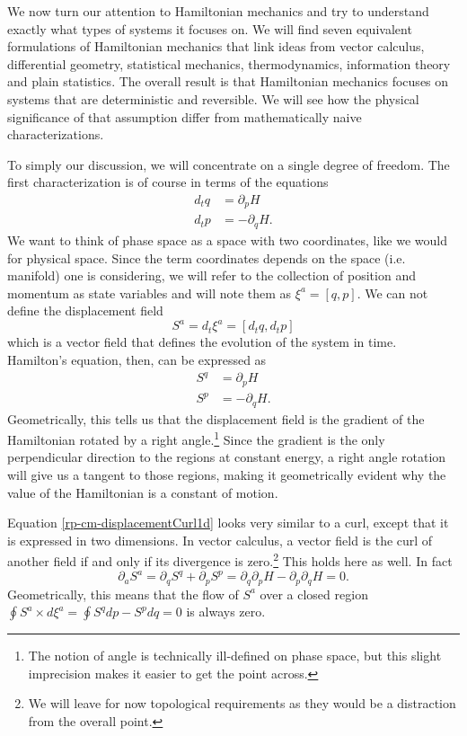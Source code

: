 We now turn our attention to Hamiltonian mechanics and try to understand exactly what types of systems it focuses on. We will find seven equivalent formulations of Hamiltonian mechanics that link ideas from vector calculus, differential geometry, statistical mechanics, thermodynamics, information theory and plain statistics. The overall result is that Hamiltonian mechanics focuses on systems that are deterministic and reversible. We will see how the physical significance of that assumption differ from mathematically naive characterizations.

To simply our discussion, we will concentrate on a single degree of freedom. The first characterization is of course in terms of the equations
\begin{equation}
	\begin{aligned}
		d_t q &= \partial_p H \\
		d_t p &= - \partial_q H.
	\end{aligned}
\end{equation}
We want to think of phase space as a space with two coordinates, like we would for physical space. Since the term coordinates depends on the space (i.e. manifold) one is considering, we will refer to the collection of position and momentum as state variables and will note them as $\xi^a = [q, p]$. We can not define the displacement field
\begin{equation}\label{rp-cm-displacement1d}
	S^a = d_t \xi^a = [d_t q, d_t p]
\end{equation}
which is a vector field that defines the evolution of the system in time. Hamilton's equation, then, can be expressed as
\begin{equation}\label{rp-cm-displacementCurl1d}
	\tag{HM-1}
	\begin{aligned}
		S^q &= \partial_p H \\
		S^p &= - \partial_q H.
	\end{aligned}
\end{equation}
Geometrically, this tells us that the displacement field is the gradient of the Hamiltonian rotated by a right angle.\footnote{The notion of angle is technically ill-defined on phase space, but this slight imprecision makes it easier to get the point across.} Since the gradient is the only perpendicular direction to the regions at constant energy, a right angle rotation will give us a tangent to those regions, making it geometrically evident why the value of the Hamiltonian is a constant of motion.

Equation \ref{rp-cm-displacementCurl1d} looks very similar to a curl, except that it is expressed in two dimensions. In vector calculus, a vector field is the curl of another field if and only if its divergence is zero.\footnote{We will leave for now topological requirements as they would be a distraction from the overall point.} This holds here as well. In fact
\begin{equation}
	\partial_a S^a = \partial_q S^q + \partial_p S^p = \partial_q \partial_p H - \partial_p \partial_q H = 0.
\end{equation}
Geometrically, this means that the flow of $S^a$ over a closed region $\oint S^a \times d\xi^a = \oint S^q dp - S^p dq = 0$ is always zero.

